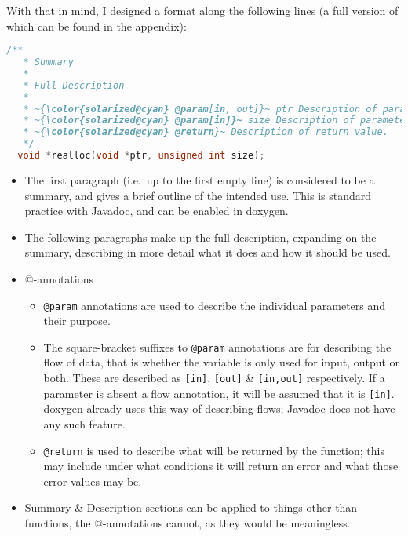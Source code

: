 With that in mind, I designed a format along the following lines (a full version
of which can be found in the appendix):

\begin{lstlisting}[language=c, escapechar=~]
  /**
   * Summary
   *
   * Full Description
   *
   * ~{\color{solarized@cyan} @param[in, out]}~ ptr Description of parameter ptr
   * ~{\color{solarized@cyan} @param[in]}~ size Description of parameter size
   * ~{\color{solarized@cyan} @return}~ Description of return value.
   */
  void *realloc(void *ptr, unsigned int size);
\end{lstlisting}

\begin{itemize}
  \item The first paragraph (i.e.~up to the first empty line) is considered to
    be a summary, and gives a brief outline of the intended use. This is
    standard practice with Javadoc, and can be enabled in doxygen.
  \item The following paragraphs make up the full description, expanding on the
    summary, describing in more detail what it does and how it should be used.
  \item @-annotations
    \begin{itemize}
      \item \lstinline|@param| annotations are used to describe the individual
        parameters and their purpose.
      \item The square-bracket suffixes to \lstinline|@param| annotations are
        for describing the flow of data, that is whether the variable is only
        used for input, output or both. These are described as \lstinline|[in]|,
        \lstinline|[out]| \& \lstinline|[in,out]| respectively. If a parameter
        is absent a flow annotation, it will be assumed that it is
        \lstinline|[in]|.
        doxygen already uses this way of describing flows; Javadoc does not have
        any such feature.
      \item \lstinline|@return| is used to describe what will be returned by the
        function; this may include under what conditions it will return an error
        and what those error values may be.
    \end{itemize}
    \item Summary \& Description sections can be applied to things other than
      functions, the @-annotations cannot, as they would be meaningless.
\end{itemize}


